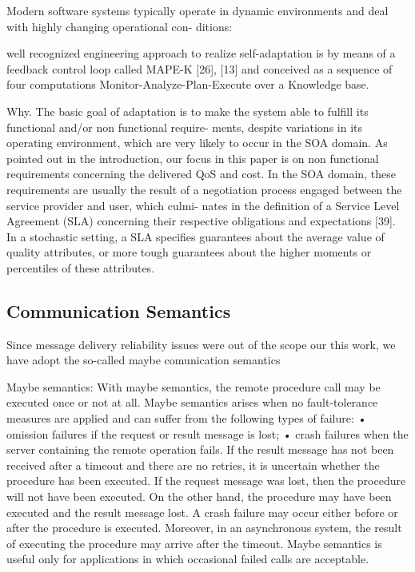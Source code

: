 \documentclass[12pt,a4paper]{report}
\begin{document}
Modern software systems typically operate in dynamic
environments and deal with highly changing operational con-
ditions: 

 well recognized engineering approach
to realize self-adaptation is by means of a feedback control
loop called MAPE-K [26], [13] and conceived as a sequence
of four computations Monitor-Analyze-Plan-Execute over a
Knowledge base.


Why. The basic goal of adaptation is to make the system
able to fulfill its functional and/or non functional require-
ments, despite variations in its operating environment,
which are very likely to occur in the SOA domain. As
pointed out in the introduction, our focus in this paper is
on non functional requirements concerning the delivered
QoS and cost. In the SOA domain, these requirements
are usually the result of a negotiation process engaged
between the service provider and user, which culmi-
nates in the definition of a Service Level Agreement (SLA)
concerning their respective obligations and expectations
[39]. In a stochastic setting, a SLA specifies guarantees
about the average value of quality attributes, or more
tough guarantees about the higher moments or percentiles
of these attributes.

\subsection{Communication Semantics}

Since message delivery reliability issues were out of the scope our this work, we have adopt the so-called maybe comunication semantics

Maybe semantics: With maybe semantics, the remote procedure call may be executed
once or not at all. Maybe semantics arises when no fault-tolerance measures are applied
and can suffer from the following types of failure:
• omission failures if the request or result message is lost;
• crash failures when the server containing the remote operation fails.
If the result message has not been received after a timeout and there are no retries, it is
uncertain whether the procedure has been executed. If the request message was lost, then
the procedure will not have been executed. On the other hand, the procedure may have
been executed and the result message lost. A crash failure may occur either before or
after the procedure is executed. Moreover, in an asynchronous system, the result of
executing the procedure may arrive after the timeout. Maybe semantics is useful only for
applications in which occasional failed calls are acceptable.
\end{document}
